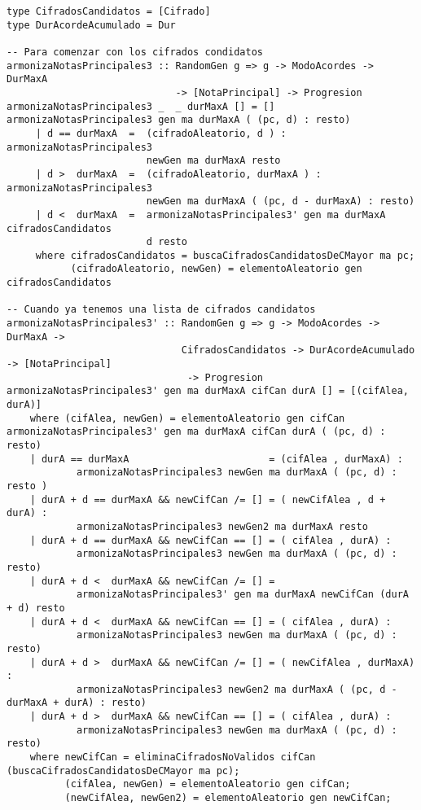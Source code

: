 \documentclass[a4paper]{report}
\begin{document}
\small
\begin{verbatim}
type CifradosCandidatos = [Cifrado]
type DurAcordeAcumulado = Dur

-- Para comenzar con los cifrados condidatos
armonizaNotasPrincipales3 :: RandomGen g => g -> ModoAcordes -> DurMaxA 
                             -> [NotaPrincipal] -> Progresion
armonizaNotasPrincipales3 _  _ durMaxA [] = []
armonizaNotasPrincipales3 gen ma durMaxA ( (pc, d) : resto)
     | d == durMaxA  =  (cifradoAleatorio, d ) : armonizaNotasPrincipales3 
                        newGen ma durMaxA resto   
     | d >  durMaxA  =  (cifradoAleatorio, durMaxA ) : armonizaNotasPrincipales3 
                        newGen ma durMaxA ( (pc, d - durMaxA) : resto)
     | d <  durMaxA  =  armonizaNotasPrincipales3' gen ma durMaxA cifradosCandidatos 
                        d resto  
     where cifradosCandidatos = buscaCifradosCandidatosDeCMayor ma pc;
           (cifradoAleatorio, newGen) = elementoAleatorio gen cifradosCandidatos 

-- Cuando ya tenemos una lista de cifrados candidatos
armonizaNotasPrincipales3' :: RandomGen g => g -> ModoAcordes -> DurMaxA -> 
                              CifradosCandidatos -> DurAcordeAcumulado -> [NotaPrincipal] 
                               -> Progresion
armonizaNotasPrincipales3' gen ma durMaxA cifCan durA [] = [(cifAlea, durA)]
    where (cifAlea, newGen) = elementoAleatorio gen cifCan 
armonizaNotasPrincipales3' gen ma durMaxA cifCan durA ( (pc, d) : resto) 
    | durA == durMaxA                        = (cifAlea , durMaxA) : 
            armonizaNotasPrincipales3 newGen ma durMaxA ( (pc, d) : resto )
    | durA + d == durMaxA && newCifCan /= [] = ( newCifAlea , d + durA) : 
            armonizaNotasPrincipales3 newGen2 ma durMaxA resto        
    | durA + d == durMaxA && newCifCan == [] = ( cifAlea , durA) : 
            armonizaNotasPrincipales3 newGen ma durMaxA ( (pc, d) : resto)   
    | durA + d <  durMaxA && newCifCan /= [] = 
            armonizaNotasPrincipales3' gen ma durMaxA newCifCan (durA + d) resto                 
    | durA + d <  durMaxA && newCifCan == [] = ( cifAlea , durA) : 
            armonizaNotasPrincipales3 newGen ma durMaxA ( (pc, d) : resto)   
    | durA + d >  durMaxA && newCifCan /= [] = ( newCifAlea , durMaxA) : 
            armonizaNotasPrincipales3 newGen2 ma durMaxA ( (pc, d - durMaxA + durA) : resto)
    | durA + d >  durMaxA && newCifCan == [] = ( cifAlea , durA) : 
            armonizaNotasPrincipales3 newGen ma durMaxA ( (pc, d) : resto)   
    where newCifCan = eliminaCifradosNoValidos cifCan (buscaCifradosCandidatosDeCMayor ma pc);
          (cifAlea, newGen) = elementoAleatorio gen cifCan;
          (newCifAlea, newGen2) = elementoAleatorio gen newCifCan;
\end{verbatim}
\end{document}
